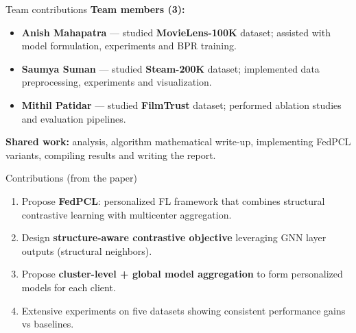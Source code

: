 \documentclass{beamer}
\begin{document}
\begin{frame}{Team contributions}
  \textbf{Team members (3):}
  \begin{itemize}
    \item \textbf{Anish Mahapatra} — studied \textbf{MovieLens-100K} dataset; assisted with model formulation, experiments and BPR training.
    \item \textbf{Saumya Suman} — studied \textbf{Steam-200K} dataset; implemented data preprocessing, experiments and visualization.
    \item \textbf{Mithil Patidar} — studied \textbf{FilmTrust} dataset; performed ablation studies and evaluation pipelines.
  \end{itemize}
  \vspace{4pt}
  \textbf{Shared work:} analysis, algorithm mathematical write-up, implementing FedPCL variants, compiling results and writing the report.
\end{frame}

\begin{frame}{Contributions (from the paper)}
  \begin{enumerate}
    \item Propose \textbf{FedPCL}: personalized FL framework that combines structural contrastive learning with multicenter aggregation.
    \item Design \textbf{structure-aware contrastive objective} leveraging GNN layer outputs (structural neighbors).
    \item Propose \textbf{cluster-level + global model aggregation} to form personalized models for each client.
    \item Extensive experiments on five datasets showing consistent performance gains vs baselines.
  \end{enumerate}
\end{frame}

\end{document}
